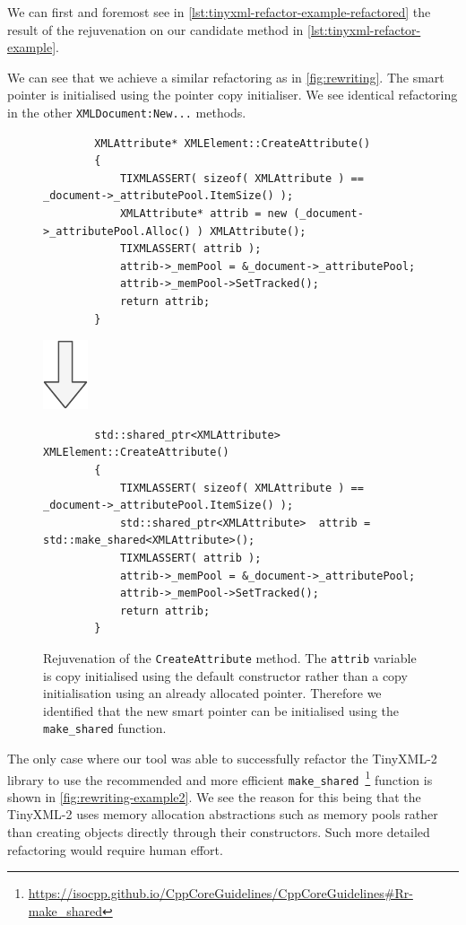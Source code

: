 \documentclass{mpaper}
\begin{document}
    We can first and foremost see in \autoref{lst:tinyxml-refactor-example-refactored} the result of the rejuvenation on our candidate method in \autoref{lst:tinyxml-refactor-example}.
    
    We can see that we achieve a similar refactoring as in \autoref{fig:rewriting}. 
    The smart pointer is initialised using the pointer copy initialiser.
    We see identical refactoring in the other \texttt{XMLDocument:New...} methods. 
    
    \begin{figure}
        \centering
        \begin{verbatim}
        XMLAttribute* XMLElement::CreateAttribute()
        {
            TIXMLASSERT( sizeof( XMLAttribute ) == _document->_attributePool.ItemSize() );
            XMLAttribute* attrib = new (_document->_attributePool.Alloc() ) XMLAttribute();
            TIXMLASSERT( attrib );
            attrib->_memPool = &_document->_attributePool;
            attrib->_memPool->SetTracked();
            return attrib;
        }
        \end{verbatim}
        
        \includegraphics{images/arrow.pdf}
        
        \begin{verbatim}
        std::shared_ptr<XMLAttribute>  XMLElement::CreateAttribute()
        {
            TIXMLASSERT( sizeof( XMLAttribute ) == _document->_attributePool.ItemSize() );
            std::shared_ptr<XMLAttribute>  attrib = std::make_shared<XMLAttribute>();
            TIXMLASSERT( attrib );
            attrib->_memPool = &_document->_attributePool;
            attrib->_memPool->SetTracked();
            return attrib;
        }
        \end{verbatim}
        \caption{Rejuvenation of the \texttt{CreateAttribute} method. The \texttt{attrib} variable is copy initialised using the default constructor rather than a copy initialisation using an already allocated pointer. Therefore we identified that the new smart pointer can be initialised using the \texttt{make\_shared} function.}
        \label{fig:rewriting-example2}
    \end{figure}
    
    The only case where our tool was able to successfully refactor the TinyXML-2 library to use the recommended and more efficient \texttt{make\_shared}~\footnote{\url{https://isocpp.github.io/CppCoreGuidelines/CppCoreGuidelines\#Rr-make_shared}} function is shown in \autoref{fig:rewriting-example2}.
    We see the reason for this being that the TinyXML-2 uses memory allocation abstractions such as memory pools rather than creating objects directly through their constructors. 
    Such more detailed refactoring would require human effort.
    
\end{document}
